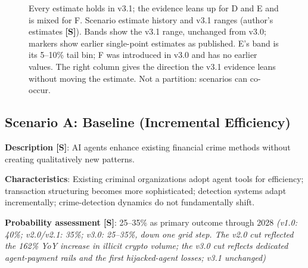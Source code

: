 \documentclass[11pt,letterpaper]{article}
\begin{document}
\begin{figure}[htbp]
\caption{Every estimate holds in v3.1; the evidence leans up for D and E and is mixed for F. Scenario estimate history and v3.1 ranges (author's estimates \textbf{[S]}). Bands show the v3.1 range, unchanged from v3.0; markers show earlier single-point estimates as published. E's band is its 5--10\% tail bin; F was introduced in v3.0 and has no earlier values. The right column gives the direction the v3.1 evidence leans without moving the estimate. Not a partition: scenarios can co-occur.}
\label{fig:scenprob}
\end{figure}

\subsection{Scenario A: Baseline (Incremental Efficiency)}

\textbf{Description [S]}: AI agents enhance existing financial crime methods without creating qualitatively new patterns.

\textbf{Characteristics}: Existing criminal organizations adopt agent tools for efficiency; transaction structuring becomes more sophisticated; detection systems adapt incrementally; crime-detection dynamics do not fundamentally shift.

\textbf{Probability assessment [S]}: 25--35\% as primary outcome through 2028 \textit{(v1.0: 40\%; v2.0/v2.1: 35\%; v3.0: 25--35\%, down one grid step. The v2.0 cut reflected the 162\% YoY increase in illicit crypto volume; the v3.0 cut reflects dedicated agent-payment rails and the first hijacked-agent losses; v3.1 unchanged)}
\end{document}

